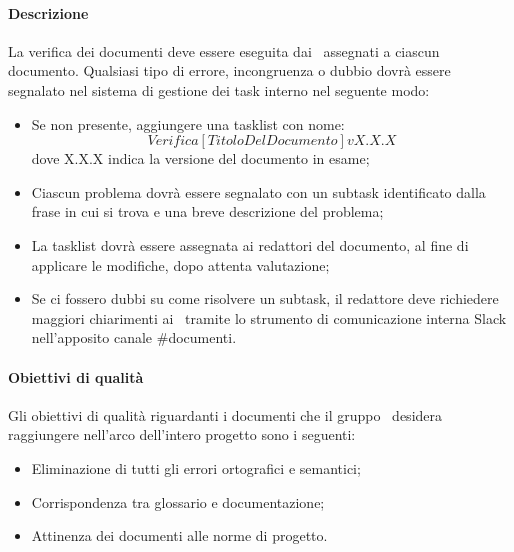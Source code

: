 \documentclass[../NormeDiProgetto_v4.0.0.tex]{subfiles}
\begin{document}
			\paragraph{Descrizione}
			La verifica dei documenti deve essere eseguita dai \verificatori\ assegnati a ciascun documento. Qualsiasi tipo di errore, incongruenza o dubbio dovrà essere segnalato nel sistema di gestione dei task interno  nel seguente modo:
			\begin{itemize}
				\item Se non presente, aggiungere una tasklist con nome:\\
				\begin{equation*}
					Verifica [TitoloDelDocumento] vX.X.X
				\end{equation*}
				dove X.X.X indica la versione del documento in esame;
				\item Ciascun problema dovrà essere segnalato con un subtask identificato dalla frase in cui si trova e una breve descrizione del problema;
				\item La tasklist dovrà essere assegnata ai redattori del documento, al fine di applicare le modifiche, dopo attenta valutazione;
				\item Se ci fossero dubbi su come risolvere un subtask, il redattore deve richiedere maggiori chiarimenti ai \verificatori\ tramite lo strumento di comunicazione interna Slack nell'apposito canale \#documenti.
			\end{itemize}

			\paragraph{Obiettivi di qualità}
			Gli obiettivi di qualità riguardanti i documenti che il gruppo \kpanic\ desidera raggiungere nell'arco dell'intero progetto sono i seguenti:
			\begin{itemize}
				\item Eliminazione di tutti gli errori ortografici e semantici;
				\item Corrispondenza tra glossario e documentazione;
				\item Attinenza dei documenti alle norme di progetto.
			\end{itemize}
			
\end{document}
